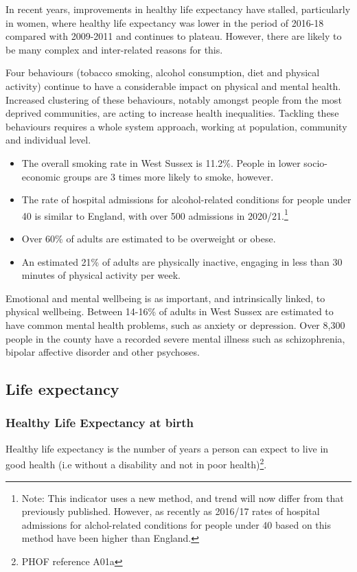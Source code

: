 In recent years, improvements in healthy life expectancy have stalled, particularly in women, where healthy life expectancy was lower in the period of 2016-18 compared with 2009-2011 and continues to plateau. However, there are likely to be many complex and inter-related reasons for this.

Four behaviours (tobacco smoking, alcohol consumption, diet and physical activity) continue to have a considerable impact on physical and mental health. Increased clustering of these behaviours, notably amongst people from the most deprived communities, are acting to increase health inequalities. Tackling these behaviours requires a whole system approach, working at population, community and individual level.

\begin{itemize}[noitemsep]
    \item The overall smoking rate in West Sussex is 11.2\%. People in lower socio-economic groups are 3 times more likely to smoke, however.
    \item The rate of hospital admissions for alcohol-related conditions for people under 40 is similar to England, with over 500 admissions in 2020/21.\footnote{Note: This indicator uses a new method, and trend will now differ from that previously published. However, as recently as 2016/17 rates of hospital admissions for alchol-related conditions for people under 40 based on this method have been higher than England.}
    \item Over 60\% of adults are estimated to be overweight or obese.
    \item An estimated 21\% of adults are physically inactive, engaging in less than 30 minutes of physical activity per week.
\end{itemize}

Emotional and mental wellbeing is as important, and intrinsically linked, to physical wellbeing. Between 14-16\% of adults in West Sussex are estimated to have common mental health problems, such as anxiety or depression. Over 8,300 people in the county have a recorded severe mental illness such as schizophrenia, bipolar affective disorder and other psychoses.

\subsection{Life expectancy}
\subsubsection{Healthy Life Expectancy at birth} Healthy life expectancy is the number of years a person can expect to live in good health (i.e without a disability and not in poor health)\footnote{PHOF reference A01a}.

